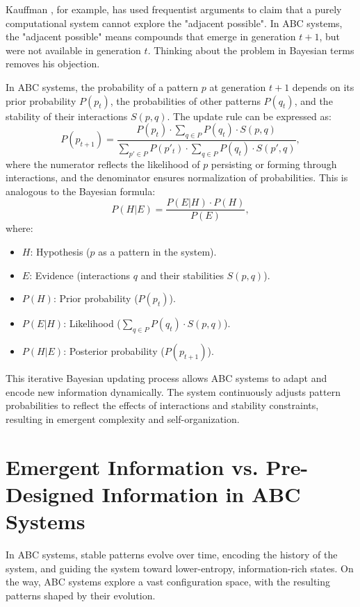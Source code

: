 \documentclass[entropy,article,submit,pdftex,moreauthors]{Definitions/mdpi}
\begin{document}
Kauffman \cite{kauffman2000investigations}, for example, has used frequentist arguments to claim that a purely computational system cannot explore the "adjacent possible". In ABC systems, the "adjacent possible" means compounds that emerge in generation \(t+1\), but were not available in generation \(t\). Thinking about the problem in Bayesian terms removes his objection.

In ABC systems, the probability of a pattern \( p \) at generation \( t+1 \) depends on its prior probability \( P(p_t) \), the probabilities of other patterns \( P(q_t) \), and the stability of their interactions \( S(p, q) \). The update rule can be expressed as:
\[
P(p_{t+1}) = \frac{P(p_t) \cdot \sum_{q \in P} P(q_t) \cdot S(p, q)}{\sum_{p' \in P} P(p'_t) \cdot \sum_{q \in P} P(q_t) \cdot S(p', q)},
\]
where the numerator reflects the likelihood of \( p \) persisting or forming through interactions, and the denominator ensures normalization of probabilities. This is analogous to the Bayesian formula:
\[
P(H|E) = \frac{P(E|H) \cdot P(H)}{P(E)},
\]
where:
\begin{itemize}
    \item[] \( H \): Hypothesis (\( p \) as a pattern in the system).
    \item[] \( E \): Evidence (interactions \( q \) and their stabilities \( S(p, q) \)).
    \item[] \( P(H) \): Prior probability (\( P(p_t) \)).
    \item[] \( P(E|H) \): Likelihood (\( \sum_{q \in P} P(q_t) \cdot S(p, q) \)).
    \item[] \( P(H|E) \): Posterior probability (\( P(p_{t+1}) \)).
\end{itemize}

This iterative Bayesian updating process allows ABC systems to adapt and encode new information dynamically. The system continuously adjusts pattern probabilities to reflect the effects of interactions and stability constraints, resulting in emergent complexity and self-organization.

\section{Emergent Information vs. Pre-Designed Information in ABC Systems}

In ABC systems, stable patterns evolve over time, encoding the history of the system, and guiding the system toward lower-entropy, information-rich states. On the way, ABC systems explore a vast configuration space, with the resulting patterns shaped by their evolution.
\end{document}
